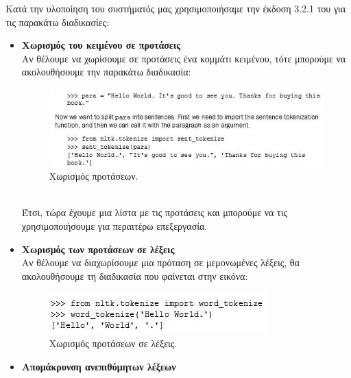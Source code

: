 {{Κατά την υλοποίηση του συστήματός μας χρησιμοποιήσαμε την έκδοση 3.2.1 του {} για τις παρακάτω διαδικασίες:
\begin{itemize}
  \item \textbf{Χωρισμός του κειμένου σε προτάσεις {}}\\
Αν θέλουμε να χωρίσουμε σε προτάσεις ένα κομμάτι κειμένου, τότε μπορούμε να ακολουθήσουμε την παρακάτω διαδικασία:
\begin{figure}[!ht] \centering
    \includegraphics[scale=0.7]{static/figures/nltk1.png}
    \caption{Χωρισμός προτάσεων.}
    \label{}
\end{figure}
\\ Έτσι, τώρα έχουμε μια λίστα με τις προτάσεις και μπορούμε να τις χρησιμοποιήσουμε για περαιτέρω επεξεργασία. 

  \item \textbf{Χωρισμός των προτάσεων σε λέξεις {}}\\
Αν θέλουμε να διαχωρίσουμε μια πρόταση σε μεμονωμένες λέξεις, θα ακολουθήσουμε τη διαδικασία που φαίνεται στην εικόνα:
\begin{figure}[!ht] \centering
    \includegraphics[scale=0.75]{static/figures/nltk3.png}
    \caption{Χωρισμός προτάσεων σε λέξεις.}
    \label{}
\end{figure}

\item \textbf{Απομάκρυνση ανεπιθύμητων λέξεων {}}\\

\end{itemize}

}}
